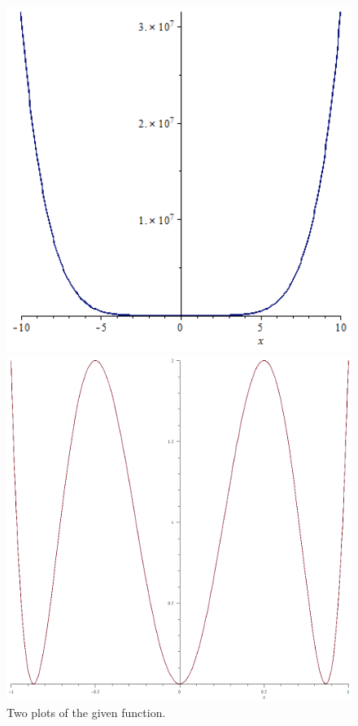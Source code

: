 \documentclass[11pt, a4paper, titlepage, openright]{article}
\begin{document}
    \begin{figure}[H]
        \begin{minipage}[b]{0.49\textwidth}
            \includegraphics[width=1.0\textwidth]{../maple/mapleChebyPlot.png}
        \end{minipage}
        \hfill
        \begin{minipage}[b]{0.49\textwidth}
            \includegraphics[width=1.0\textwidth]{../maple/mapleChebyPlotZoom.png}
        \end{minipage}
        \caption{Two plots of the given function.}
        \label{fig:function}
    \end{figure}
\bigskip
\bigskip
\end{document}
